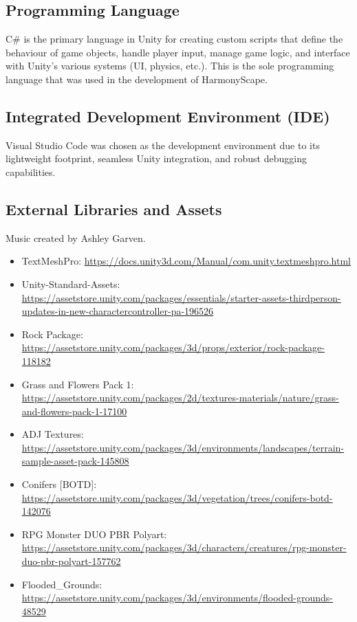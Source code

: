 \documentclass{l4proj}
\begin{document}
\subsection{Programming Language}
C# is the primary language in Unity for creating custom scripts that define the behaviour of game objects, handle player input, manage game logic, and interface with Unity's various systems (UI, physics, etc.). This is the sole programming language that was used in the development of HarmonyScape.

\subsection{Integrated Development Environment (IDE)}
Visual Studio Code was chosen as the development environment due to its lightweight footprint, seamless Unity integration, and robust debugging capabilities.

\subsection{External Libraries and Assets}
Music created by Ashley Garven.

\begin{itemize}
    \item TextMeshPro: \url{https://docs.unity3d.com/Manual/com.unity.textmeshpro.html}
    \item Unity-Standard-Assets: \url{https://assetstore.unity.com/packages/essentials/starter-assets-thirdperson-updates-in-new-charactercontroller-pa-196526}
    \item Rock Package: \url{https://assetstore.unity.com/packages/3d/props/exterior/rock-package-118182}
    \item Grass and Flowers Pack 1: \url{https://assetstore.unity.com/packages/2d/textures-materials/nature/grass-and-flowers-pack-1-17100}
    \item ADJ Textures: \url{https://assetstore.unity.com/packages/3d/environments/landscapes/terrain-sample-asset-pack-145808}
    \item Conifers [BOTD]: \url{https://assetstore.unity.com/packages/3d/vegetation/trees/conifers-botd-142076}
    \item RPG Monster DUO PBR Polyart: \url{https://assetstore.unity.com/packages/3d/characters/creatures/rpg-monster-duo-pbr-polyart-157762}
    \item Flooded\_Grounds: \url{https://assetstore.unity.com/packages/3d/environments/flooded-grounds-48529}
\end{itemize}
\end{document}
